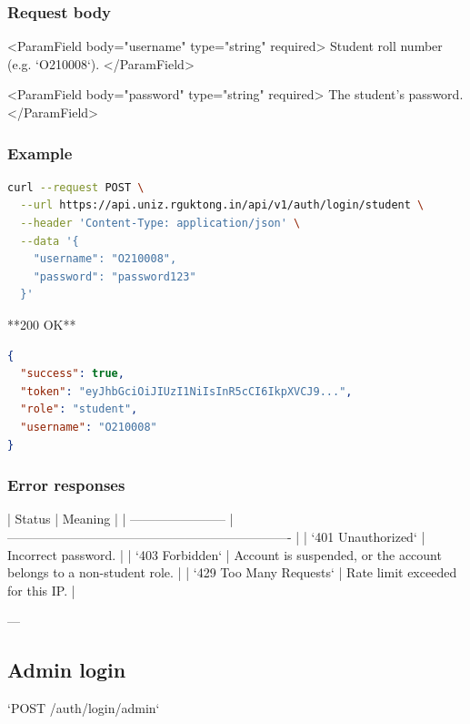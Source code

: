 \subsubsection{Request body}

<ParamField body="username" type="string" required>
  Student roll number (e.g. `O210008`).
</ParamField>

<ParamField body="password" type="string" required>
  The student's password.
</ParamField>

\subsubsection{Example}

\begin{lstlisting}[language=bash]
curl --request POST \
  --url https://api.uniz.rguktong.in/api/v1/auth/login/student \
  --header 'Content-Type: application/json' \
  --data '{
    "username": "O210008",
    "password": "password123"
  }'

\end{lstlisting}

**200 OK**

\begin{lstlisting}[language=json]
{
  "success": true,
  "token": "eyJhbGciOiJIUzI1NiIsInR5cCI6IkpXVCJ9...",
  "role": "student",
  "username": "O210008"
}

\end{lstlisting}

\subsubsection{Error responses}

| Status                  | Meaning                                                             |
| ----------------------- | ------------------------------------------------------------------- |
| `401 Unauthorized`      | Incorrect password.                                                 |
| `403 Forbidden`         | Account is suspended, or the account belongs to a non-student role. |
| `429 Too Many Requests` | Rate limit exceeded for this IP.                                    |

---

\subsection{Admin login}

`POST /auth/login/admin`

